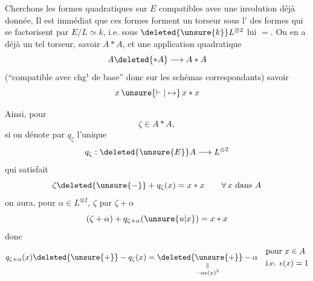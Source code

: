 Cherchons les formes quadratiques 
sur $E$ compatibles avec une involution déjà donnée, 
Il est immédiat 
que ces formes forment un torseur
sous l' des formes 
qui se factorisent par $E/L\simeq k$, i.e. sous
$\deleted{\unsure{k}}L^{\otimes 2}$ lui $=$.
On en a déjà un tel torseur, savoir $A*A$, et une
application quadratique 
\[
A\deleted{*A}\longrightarrow A*A
\]
(``compatible avec chg$^{\mathrm t}$ de base'' donc
 sur les schémas correspondants)
savoir
\[
x\,\unsure{\mathrel{\vdash}|\mapsto}\,x*x
\]

Ainsi,  pour 
\[
\zeta\in A*A,
\]
si on dénote par $q_\zeta$ l'unique  
 
\[
q_\zeta:\deleted{\unsure{E}}A\longrightarrow L^{\otimes 2}
\]
qui satisfait
\[
\zeta\deleted{\unsure{-}}+q_\zeta(x)=x*x\qquad \forall\,x\text{ dans }A
\]
on aura, pour $\alpha\in L^{\otimes 2}$, 
$\zeta$ par $\zeta+\alpha$
\[
(\zeta+\alpha)+q_{\zeta+\alpha}(\unsure{u|x})=x*x
\]
donc
\[
q_{\zeta+\alpha}(x)\deleted{\unsure{+}}-q_\zeta(x)=
\underset{\substack{\Vert\\-\alpha\epsilon(x)^2}}{\deleted{\unsure{+}}-\alpha}
\quad\begin{aligned}&\text{pour }x\in A\\&\text{i.e. }\epsilon(x)=1\end{aligned}
\]
